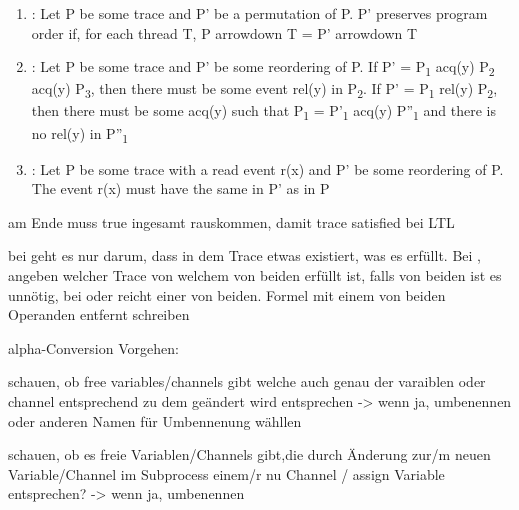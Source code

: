 \documentclass[landscape, a4paper]{article}
\begin{document}
\begin{minipage}[t]{0.19\linewidth}
\begin{enumerate}
		\item {}: Let P be some trace and P' be a permutation of P. P' preserves program order if, for each thread T, P arrowdown T = P' arrowdown T
		\item {}: Let P be some trace and P' be some reordering of P. If P' = P\textsubscript{1} acq(y) P\textsubscript{2} acq(y) P\textsubscript{3}, then there must be some event rel(y) in P\textsubscript{2}. If P' = P\textsubscript{1} rel(y) P\textsubscript{2}, then there must be some acq(y) such that P\textsubscript{1} = P'\textsubscript{1} acq(y) P''\textsubscript{1} and there is no rel(y) in P''\textsubscript{1}
		\item {}: Let P be some trace with a read event r(x) and P' be some reordering of P. The event r(x) must have the same  in P' as in P
	\end{enumerate}
  \begin{betterlist} 
		\item am Ende muss true ingesamt rauskommen, damit trace satisfied bei LTL
		\item bei  geht es nur darum, dass in dem Trace etwas existiert, was es erfüllt. Bei , angeben welcher Trace von welchem von beiden erfüllt ist, falls von beiden ist es unnötig, bei oder reicht einer von beiden. Formel mit einem von beiden Operanden entfernt schreiben
		\item alpha-Conversion Vorgehen:
		\begin{betterlist}
			\item schauen, ob free variables/channels gibt welche auch genau der varaiblen oder channel entsprechend zu dem geändert wird entsprechen -> wenn ja, umbenennen oder anderen Namen für Umbennenung wähllen
			\item schauen, ob es freie Variablen/Channels gibt,die durch Änderung zur/m neuen Variable/Channel im Subprocess einem/r nu Channel / assign Variable entsprechen? -> wenn ja, umbenennen

\end{betterlist}
\end{betterlist}
\end{minipage}
\end{document}
